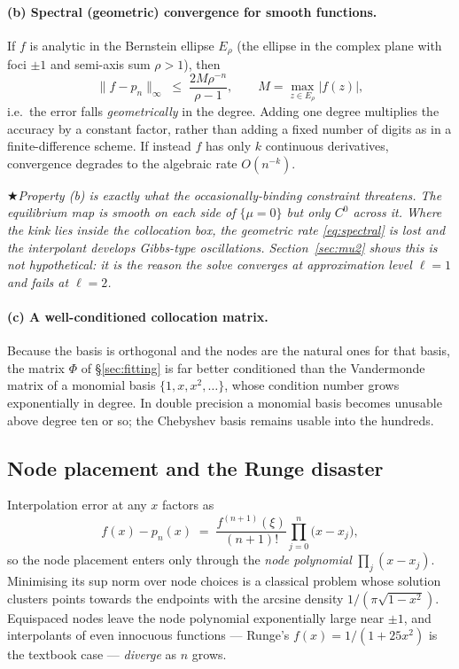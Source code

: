 \documentclass[11pt]{article}
\numberwithin{equation}{section}
\theoremstyle{definition}
\theoremstyle{plain}
\theoremstyle{remark}
\newcommand{\warn}[1]{\par\smallskip\noindent
  \textcolor{red!60!black}{$\bigstar$}\;\emph{#1}\par\smallskip}
\begin{document}
\paragraph{(b) Spectral (geometric) convergence for smooth functions.} If $f$ is
analytic in the Bernstein ellipse $E_\rho$ (the ellipse in the complex plane with
foci $\pm1$ and semi-axis sum $\rho>1$), then
\begin{equation}
\|f-p_n\|_{\infty}\;\le\;\frac{2M\rho^{-n}}{\rho-1},
\qquad M=\max_{z\in E_\rho}|f(z)| ,
\label{eq:spectral}
\end{equation}
i.e.\ the error falls \emph{geometrically} in the degree. Adding one degree
multiplies the accuracy by a constant factor, rather than adding a fixed number of
digits as in a finite-difference scheme. If instead $f$ has only $k$ continuous
derivatives, convergence degrades to the algebraic rate $O(n^{-k})$.

\warn{Property (b) is exactly what the occasionally-binding constraint threatens.
The equilibrium map is smooth on each side of $\{\mu=0\}$ but only $C^{0}$ across it.
Where the kink lies inside the collocation box, the geometric rate
\eqref{eq:spectral} is lost and the interpolant develops Gibbs-type oscillations.
Section~\ref{sec:mu2} shows this is not hypothetical: it is the reason the solve
converges at approximation level $\ell=1$ and fails at $\ell=2$.}

\paragraph{(c) A well-conditioned collocation matrix.} Because the basis is
orthogonal and the nodes are the natural ones for that basis, the matrix $\Phi$ of
\S\ref{sec:fitting} is far better conditioned than the Vandermonde matrix of a
monomial basis $\{1,x,x^{2},\dots\}$, whose condition number grows exponentially in
degree. In double precision a monomial basis becomes unusable above degree ten or so;
the Chebyshev basis remains usable into the hundreds.

\subsection{Node placement and the Runge disaster}
\label{sec:runge}

Interpolation error at any $x$ factors as
\begin{equation}
f(x)-p_n(x)\;=\;\frac{f^{(n+1)}(\xi)}{(n+1)!}\prod_{j=0}^{n}\bigl(x-x_j\bigr),
\label{eq:interp-error}
\end{equation}
so the node placement enters only through the \emph{node polynomial}
$\prod_j(x-x_j)$. Minimising its sup norm over node choices is a classical problem
whose solution clusters points towards the endpoints with the arcsine density
$1/(\pi\sqrt{1-x^{2}})$. Equispaced nodes leave the node polynomial exponentially
large near $\pm1$, and interpolants of even innocuous functions --- Runge's
$f(x)=1/(1+25x^{2})$ is the textbook case --- \emph{diverge} as $n$ grows.
\end{document}
